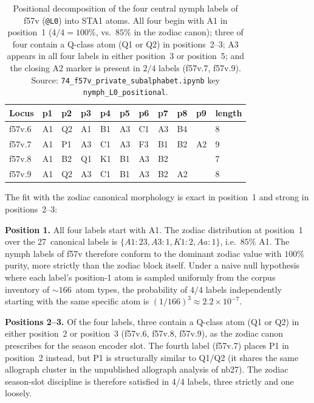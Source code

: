\begin{table}[h]
\centering
\small
\begin{tabular}{lllllllllll}
\toprule
Locus & p1 & p2 & p3 & p4 & p5 & p6 & p7 & p8 & p9 & length \\
\midrule
f57v.6 & A1 & Q2 & A1 & B1 & A3 & C1 & A3 & B4 &     & 8 \\
f57v.7 & A1 & P1 & A3 & C1 & A3 & F3 & B1 & B2 & A2 & 9 \\
f57v.8 & A1 & B2 & Q1 & K1 & B1 & A3 & B2 &    &     & 7 \\
f57v.9 & A1 & Q2 & A3 & C1 & B1 & A3 & B2 & A2 &     & 8 \\
\bottomrule
\end{tabular}
\caption{Positional decomposition of the four central nymph labels of
f57v (\texttt{@L0}) into STA1 atoms. All four begin with A1 in
position~1 ($4/4 = 100\%$, vs.\ $85\%$ in the zodiac canon); three of
four contain a Q-class atom (Q1 or Q2) in positions~2--3; A3 appears in
all four labels in either position~3 or position~5; and the closing A2
marker is present in $2/4$ labels (f57v.7, f57v.9). Source:
\texttt{74\_f57v\_private\_subalphabet.ipynb} key
\texttt{nymph\_L0\_positional}.}
\label{tab:l0}
\end{table}

The fit with the zodiac canonical morphology is exact in position~1 and
strong in positions~2--3:

\noindent\textbf{Position 1.} All four labels start with A1. The zodiac
distribution at position~1 over the 27~canonical labels is
$\{A1\!:\!23, A3\!:\!1, K1\!:\!2, Aa\!:\!1\}$, i.e.\ $85\%$ A1. The
nymph labels of f57v therefore conform to the dominant zodiac value with
$100\%$ purity, more strictly than the zodiac block itself. Under a
naive null hypothesis where each label's position-1 atom is sampled
uniformly from the corpus inventory of $\sim 166$~atom types, the
probability of $4/4$ labels independently starting with the same
specific atom is $(1/166)^3 \approx 2.2\times 10^{-7}$.

\noindent\textbf{Positions 2--3.} Of the four labels, three contain a
Q-class atom (Q1 or Q2) in either position~2 or position~3 (f57v.6,
f57v.8, f57v.9), as the zodiac canon prescribes for the season encoder
slot. The fourth label (f57v.7) places P1 in position~2 instead, but P1
is structurally similar to Q1/Q2 (it shares the same allograph cluster
in the unpublished allograph analysis of nb27). The zodiac season-slot
discipline is therefore satisfied in 4/4 labels, three strictly and one
loosely.

